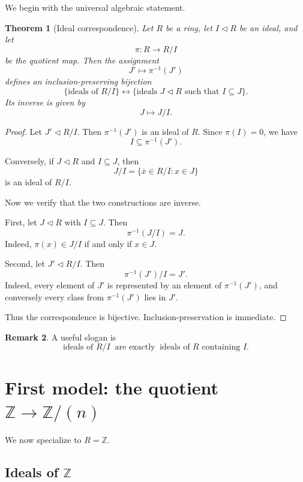 \documentclass[11pt]{article}
\newtheorem{theorem}{Theorem}[section]
\theoremstyle{definition}
\newtheorem{remark}[theorem]{Remark}
\newcommand{\Z}{\mathbb{Z}}
\newcommand{\ol}[1]{\overline{#1}}
\begin{document}
	We begin with the universal algebraic statement.
	
	\begin{theorem}[Ideal correspondence]\label{thm:ideal-correspondence}
		Let \(R\) be a ring, let \(I\triangleleft R\) be an ideal, and let
		\[
		\pi:R\to R/I
		\]
		be the quotient map. Then the assignment
		\[
		J' \longmapsto \pi^{-1}(J')
		\]
		defines an inclusion-preserving bijection
		\[
		\{\text{ideals of }R/I\}
		\longleftrightarrow
		\{\text{ideals }J\triangleleft R \text{ such that } I\subseteq J\}.
		\]
		Its inverse is given by
		\[
		J \longmapsto J/I.
		\]
	\end{theorem}
	
	\begin{proof}
		Let \(J'\triangleleft R/I\). Then \(\pi^{-1}(J')\) is an ideal of \(R\). Since \(\pi(I)=0\), we have
		\[
		I\subseteq \pi^{-1}(J').
		\]
		
		Conversely, if \(J\triangleleft R\) and \(I\subseteq J\), then
		\[
		J/I=\{\ol{x}\in R/I:x\in J\}
		\]
		is an ideal of \(R/I\).
		
		Now we verify that the two constructions are inverse.
		
		First, let \(J\triangleleft R\) with \(I\subseteq J\). Then
		\[
		\pi^{-1}(J/I)=J.
		\]
		Indeed, \(\pi(x)\in J/I\) if and only if \(x\in J\).
		
		Second, let \(J'\triangleleft R/I\). Then
		\[
		\pi^{-1}(J')/I=J'.
		\]
		Indeed, every element of \(J'\) is represented by an element of \(\pi^{-1}(J')\), and conversely every class from \(\pi^{-1}(J')\) lies in \(J'\).
		
		Thus the correspondence is bijective. Inclusion-preservation is immediate.
	\end{proof}
	
	\begin{remark}
		A useful slogan is
		\[
		\boxed{
			\text{ideals of }R/I
			\;\;\text{are exactly}\;\;
			\text{ideals of }R\text{ containing }I.
		}
		\]
	\end{remark}
	
	\section{First model: the quotient \(\Z\to \Z/(n)\)}
	
	We now specialize to \(R=\Z\).
	
	\subsection{Ideals of \(\Z\)}
	
\end{document}
